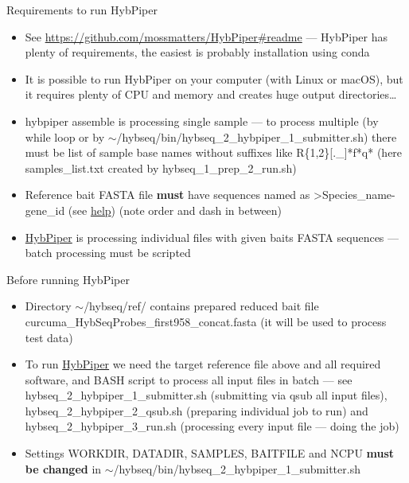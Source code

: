 \documentclass[compress, ucs, xelatex, 11pt, xcolor=x11names, aspectratio=169,
	hyperref={
		bookmarks=true,
		unicode=true,
		colorlinks=true,
		pdftitle={HybSeq course},
		plainpages=false,
		pdfauthor={Vojtech Zeisek},
		pdfsubject={Practical processing of HybSeq target enrichment sequencing data on computing grids like MetaCentrum},
		pdfcreator={XeLaTeX},
		pdfkeywords={BASH, command line, GNU, HybSeq, Linux, MetaCentrum, sequencing shell, target enrichment},
		linkcolor=Turquoise4, %
		anchorcolor=DodgerBlue4, %
		citecolor=DodgerBlue4, %
		filecolor=DodgerBlue4, %
		menucolor=Tan4, %
		urlcolor=DarkOliveGreen4, %
		pdftex},
	url={hyphens, lowtilde} %
	]{beamer}
\renewcommand{\texttt}[1]{\colorbox{Cornsilk2}{{\ttfamily #1}}}
\renewcommand{\alert}[1]{\textcolor{OrangeRed3}{#1}}
\begin{document}
\begin{frame}{Requirements to run HybPiper}
	\begin{itemize}
		\item See \url{https://github.com/mossmatters/HybPiper\#readme} --- HybPiper has plenty of requirements, the easiest is probably installation using \texttt{conda}
		\item It is possible to run HybPiper on your computer (with Linux or macOS), but it requires plenty of CPU and memory and creates huge output directories\ldots
		\item \texttt{hybpiper assemble} is processing single sample --- to process multiple (by \texttt{while} loop or by \texttt{$\sim$/hybseq/bin/hybseq\_2\_hybpiper\_1\_submitter.sh}) there must be list of sample base names without suffixes like \texttt{*[.\_]R\{1,2\}[.\_]*f*q*} (here \texttt{samples\_list.txt} created by \texttt{hybseq\_1\_prep\_2\_run.sh})
		\item Reference bait FASTA file \textbf{must} have sequences named as \texttt{>Species\_name\alert{-}gene\_id} (see \href{https://github.com/mossmatters/HybPiper/wiki\#12-target-file}{help}) (\alert{note} order and dash in between)
		\item \href{https://github.com/mossmatters/HybPiper}{HybPiper} is processing individual files with given baits FASTA sequences --- batch processing must be scripted
	\end{itemize}
\end{frame}

\begin{frame}{Before running HybPiper}
	\begin{itemize}
		\item Directory \texttt{$\sim$/hybseq/ref/} contains prepared reduced bait file \texttt{curcuma\_HybSeqProbes\_first958\_concat.fasta} (it will be used to process test data)
		\item To run \href{https://github.com/mossmatters/HybPiper}{HybPiper} we need the target reference file above and all required software, and BASH script to process all input files in batch --- see \texttt{hybseq\_2\_hybpiper\_1\_submitter.sh} (submitting via \texttt{qsub} all input files), \texttt{hybseq\_2\_hybpiper\_2\_qsub.sh} (preparing individual job to run) and \texttt{hybseq\_2\_hybpiper\_3\_run.sh} (processing every input file --- doing the job)
		\item \alert{Settings} \texttt{WORKDIR}, \texttt{DATADIR}, \texttt{SAMPLES}, \texttt{BAITFILE} and \texttt{NCPU} \textbf{must be changed} in \texttt{$\sim$/hybseq/bin/hybseq\_2\_hybpiper\_1\_submitter.sh}
	\end{itemize}
\end{frame}
\end{document}
